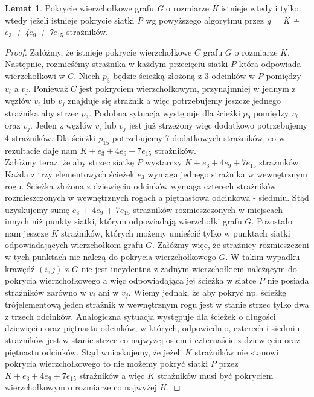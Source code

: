 \documentclass[brudnopis]{xmgr}
\theoremstyle{definition}
\newtheorem{Lemat}{Lemat}
\begin{document}
\begin{Lemat}\cite{orourke}
	Pokrycie wierzchołkowe grafu \emph{G} o rozmiarze \emph{K} istnieje wtedy i tylko wtedy jeżeli istnieje pokrycie siatki \emph{P} wg powyższego algorytmu przez \emph{g = K + $e_3$ + 4$e_9$ + 7$e_{15}$} strażników.
\end{Lemat}
\begin{proof} 
	Załóżmy, że istnieje pokrycie wierzchołkowe $C$ grafu $G$ o rozmiarze $K$. Następnie, rozmieśćmy strażnika w każdym przecięciu siatki $P$ która odpowiada wierzchołkowi w $C$.
	Niech $p_3$ będzie ścieżką złożoną z 3 odcinków w $P$ pomiędzy $v_i$ a $v_j$. Ponieważ $C$ jest pokryciem wierzchołkowym, przynajmniej w jednym z węzłów $v_i$ lub $v_j$ znajduje się strażnik a więc potrzebujemy jeszcze jednego strażnika aby strzec $p_3$. Podobna sytuacja występuje dla ścieżki $p_9$ pomiędzy $v_i$ oraz $v_j$. Jeden z węzłów $v_i$ lub $v_j$ jest już strzeżony więc dodatkowo potrzebujemy 4 strażników. Dla ścieżki $p_{15}$ potrzebujemy 7 dodatkowych strażników, co w rezultacie daje nam $K + e_3 + 4e_9 + 7e_{15}$ strażników.
	\\\indent Załóżmy teraz, że aby strzec siatkę $P$ wystarczy $K + e_3 + 4e_9 + 7e_{15}$ strażników. Każda z trzy elementowych ścieżek $e_3$ wymaga jednego strażnika w wewnętrznym rogu. Ścieżka złożona z dziewięciu odcinków wymaga czterech strażników rozmieszczonych w wewnętrznych rogach a piętnastowa odcinkowa - siedmiu. Stąd uzyskujemy sumę $e_3$ + 4$e_9$ + 7$e_{15}$ strażników rozmieszczonych w miejscach innych niż punkty siatki, którym odpowiadają wierzchołki grafu $G$. Pozostało nam jeszcze $K$ strażników, których możemy umieścić tylko w punktach siatki odpowiadających wierzchołkom grafu $G$. Załóżmy więc, że strażnicy rozmieszczeni w tych punktach nie należą do pokrycia wierzchołkowego $G$. W takim wypadku krawędź $(i, j)$ z $G$ nie jest incydentna z żadnym wierzchołkiem należącym do pokrycia wierzchołkowego a więc odpowiadająca jej ścieżka w siatce $P$ nie posiada strażników zarówno w $v_i$ ani w $v_j$. Wiemy jednak, że aby pokryć np. ścieżkę trójelementową jeden strażnik w wewnętrznym rogu jest w stanie strzec tylko dwa z trzech odcinków. Analogiczna sytuacja występuje dla ścieżek o długości dziewięciu oraz piętnastu odcinków, w których, odpowiednio, czterech i siedmiu strażników jest w stanie strzec co najwyżej osiem i czternaście z dziewięciu oraz piętnastu odcinków. Stąd wnioskujemy, że jeżeli $K$ strażników nie stanowi pokrycia wierzchołkowego to nie możemy pokryć siatki $P$ przez $K + e_3 + 4e_9 + 7e_{15}$ strażników a więc $K$ strażników musi być pokryciem wierzchołkowym o rozmiarze co najwyżej $K$. 
\end{proof}
\end{document}
